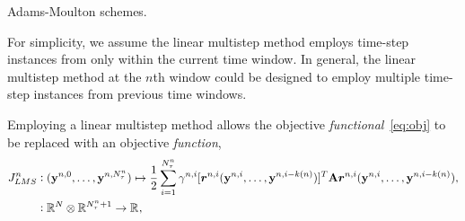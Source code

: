 Adams-Moulton schemes. 
\begin{remark}\label{remark:LMS}
For simplicity, we assume the linear multistep method employs time-step instances from only within the current time window. In general, the linear multistep method at the $n$th window could be designed to employ multiple time-step instances from previous time windows.
\end{remark}
Employing a linear multistep method allows the objective \textit{functional}~\eqref{eq:obj} to be replaced with an objective \textit{function},
\begin{equation}\label{eq:obj_lms}
\begin{split} 
\objectiveArgLMS{n} &\vcentcolon (\stateyDiscreteArgnt{n,0},\ldots,\stateyDiscreteArgnt{n,\nstepsArg{n}}) \mapsto
\frac{1}{2} \sum_{i=1}^{\nstepsArg{n}} \quadWeightsLMSScalarArg{n}{i} [\residArg{n,i}(\stateyDiscreteArgnt{n,i},\ldots, \stateyDiscreteArgnt{n,i-k(n)})]^T  \stweightingMatArgt{n}{\timeWindowArg{n}{i}} \residArg{n,i}(\stateyDiscreteArgnt{n,i},\ldots, \stateyDiscreteArgnt{n,i-k(n)}), \\
&\vcentcolon \RR{\fomdim} \otimes \RR{\nstepsArg{n}+1} \rightarrow
\RR{}, 
\end{split}
\end{equation}
